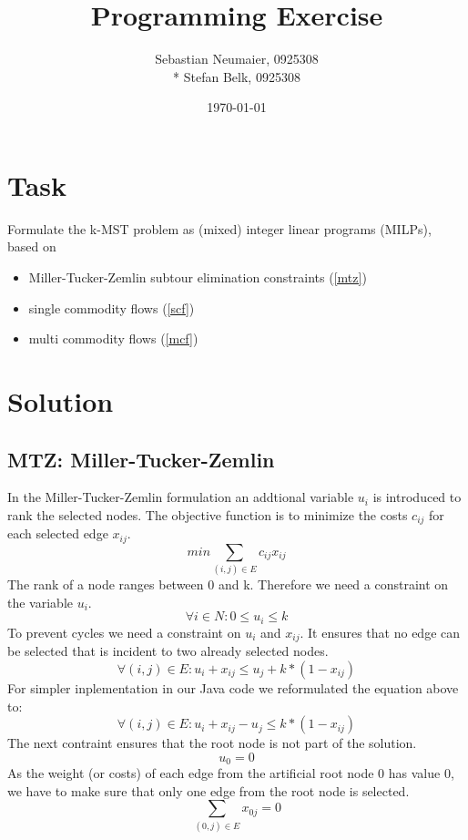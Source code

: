 \documentclass{article}
\title{Programming Exercise}
\author{Sebastian Neumaier, 0925308 \\* Stefan Belk, 0925308}
\date{\today}
\begin{document}
\maketitle

\section{Task}

Formulate the k-MST problem as (mixed) integer linear programs (MILPs), based on
\begin{itemize}
\item Miller-Tucker-Zemlin subtour elimination constraints (\ref{mtz})
\item single commodity flows (\ref{scf})
\item multi commodity flows (\ref{mcf})
\end{itemize}
\section{Solution}

\subsection{MTZ: Miller-Tucker-Zemlin \label{mtz}}
In the Miller-Tucker-Zemlin formulation an addtional variable $u_i$ is introduced to rank the selected nodes. The objective function is to minimize the costs $c_{ij}$ for each selected edge $x_{ij}$.
\begin{equation}
min \sum_{(i,j) \in E} c_{ij} x_{ij}
\end{equation}
The rank of a node ranges between 0 and k. Therefore we need a constraint on the variable $u_i$.
\begin{equation}
\forall i \in N : 0 \le u_i \le k
\end{equation}
To prevent cycles we need a constraint on $u_i$ and $x_{ij}$. It ensures that no edge can be selected that is incident to two already selected nodes.
\begin{equation}
\forall (i,j) \in E : u_i + x_{ij} \le u_j + k * ( 1 - x_{ij})
\end{equation}
For simpler inplementation in our Java code we reformulated the equation above to:
\begin{equation}
\forall (i,j) \in E : u_i + x_{ij} - u_j \le k * ( 1 - x_{ij})
\end{equation}
The next contraint ensures that the root node is not part of the solution.
\begin{equation}
u_0 = 0
\end{equation}
As the weight (or costs) of each edge from the artificial root node 0 has value 0, we have to make sure that only one edge from the root node is selected.
\begin{equation}
\sum_{(0,j) \in E} x_{0j} = 0
\end{equation}
\end{document}
